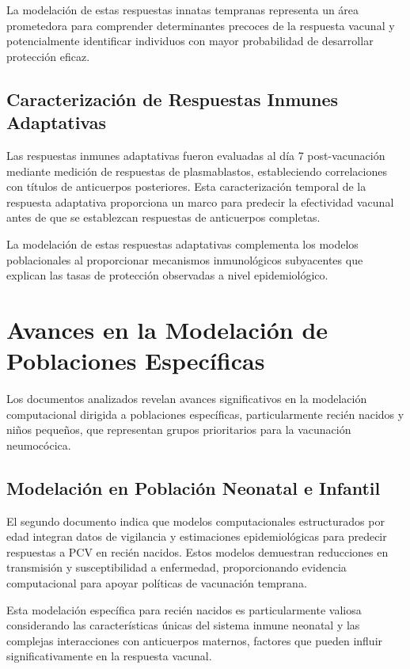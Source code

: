 La modelación de estas respuestas innatas tempranas representa un área prometedora para comprender determinantes precoces de la respuesta vacunal y potencialmente identificar individuos con mayor probabilidad de desarrollar protección eficaz.

\subsection{Caracterización de Respuestas Inmunes Adaptativas}

Las respuestas inmunes adaptativas fueron evaluadas al día 7 post-vacunación mediante medición de respuestas de plasmablastos, estableciendo correlaciones con títulos de anticuerpos posteriores. Esta caracterización temporal de la respuesta adaptativa proporciona un marco para predecir la efectividad vacunal antes de que se establezcan respuestas de anticuerpos completas.

La modelación de estas respuestas adaptativas complementa los modelos poblacionales al proporcionar mecanismos inmunológicos subyacentes que explican las tasas de protección observadas a nivel epidemiológico.

\section{Avances en la Modelación de Poblaciones Específicas}

Los documentos analizados revelan avances significativos en la modelación computacional dirigida a poblaciones específicas, particularmente recién nacidos y niños pequeños, que representan grupos prioritarios para la vacunación neumocócica.

\subsection{Modelación en Población Neonatal e Infantil}

El segundo documento indica que modelos computacionales estructurados por edad integran datos de vigilancia y estimaciones epidemiológicas para predecir respuestas a PCV en recién nacidos. Estos modelos demuestran reducciones en transmisión y susceptibilidad a enfermedad, proporcionando evidencia computacional para apoyar políticas de vacunación temprana.

Esta modelación específica para recién nacidos es particularmente valiosa considerando las características únicas del sistema inmune neonatal y las complejas interacciones con anticuerpos maternos, factores que pueden influir significativamente en la respuesta vacunal.

